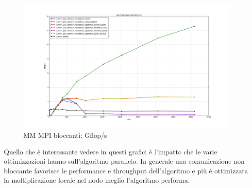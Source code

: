 \begin{figure}[htbp]
    \begin{center}
        \includegraphics[width=15cm]{immagini/non_blocking_gflops.png}
    \end{center}
    \caption{MM MPI bloccanti: Gflop/s}
    \label{fig:non_blocking_gflops}
\end{figure}

Quello che \`{e} interessante vedere in questi grafici \`{e} l'impatto che le varie ottimizzazioni hanno sull'algoritmo parallelo. In generale una comunicazione non bloccante favorisce le performance e throughput dell'algoritmo e pi\`{u} \`{e} ottimizzata la moltiplicazione locale nel nodo meglio l'algoritmo performa.
